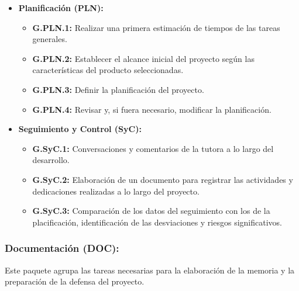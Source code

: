\begin{itemize}
    \item \textbf{Planificación (PLN):}
          \begin{itemize}
              \item \textbf{G.PLN.1:} Realizar una primera estimación de tiempos de las tareas generales.
              \item \textbf{G.PLN.2:} Establecer el alcance inicial del proyecto según las características del producto seleccionadas.
              \item \textbf{G.PLN.3:} Definir la planificación del proyecto.
              \item \textbf{G.PLN.4:} Revisar y, si fuera necesario, modificar la planificación.
          \end{itemize}
    \item \textbf{Seguimiento y Control (SyC):}
          \begin{itemize}
              \item \textbf{G.SyC.1:} Conversaciones y comentarios de la tutora a lo largo del desarrollo.
              \item \textbf{G.SyC.2:} Elaboración de un documento para registrar las actividades y dedicaciones realizadas a lo largo del proyecto.
              \item \textbf{G.SyC.3:} Comparación de los datos del seguimiento con los de la placificación, identificación de las desviaciones y riesgos significativos.
          \end{itemize}
\end{itemize}

\subsubsection{Documentación (DOC):}

Este paquete agrupa las tareas necesarias para la elaboración de la memoria y la preparación de la defensa del proyecto.

